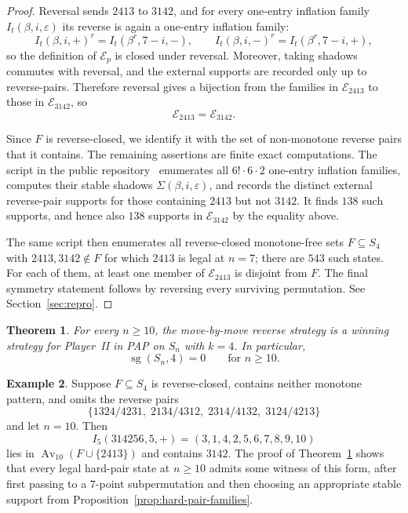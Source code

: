 \documentclass[11pt]{amsart}
\newcommand{\Sym}{S}
\newcommand{\Av}{\operatorname{Av}}
\newcommand{\sg}{\operatorname{sg}}
\theoremstyle{plain}
\newtheorem{theorem}{Theorem}[section]
\theoremstyle{definition}
\newtheorem{example}[theorem]{Example}
\theoremstyle{remark}
\begin{document}
\begin{proof}
  Reversal sends $2413$ to $3142$, and for every one-entry inflation family
  $I_t(\beta,i,\varepsilon)$ its reverse is again a one-entry inflation family:
  \[
    I_t(\beta,i,+)^r = I_t(\beta^r,7-i,-),
    \qquad
    I_t(\beta,i,-)^r = I_t(\beta^r,7-i,+),
  \]
  so the definition of $\mathcal{E}_p$ is closed under reversal.  Moreover,
  taking shadows commutes with reversal, and the external supports are recorded only up to
  reverse-pairs.  Therefore reversal gives a bijection from the families in
  $\mathcal{E}_{2413}$ to those in $\mathcal{E}_{3142}$, so
  \[
    \mathcal{E}_{2413}=\mathcal{E}_{3142}.
  \]

  Since $F$ is reverse-closed, we identify it with the set of non-monotone reverse pairs that it
  contains.  The remaining assertions are finite exact computations.  The script
   in the public repository~\cite{game-patterns-repo}
  enumerates all $6!\cdot 6 \cdot 2$ one-entry inflation families,
  computes their stable shadows $\Sigma(\beta,i,\varepsilon)$, and records the distinct external
  reverse-pair supports for those containing $2413$ but not $3142$.  It finds $138$ such supports,
  and hence also $138$ supports in $\mathcal{E}_{3142}$ by the equality above.

  The same script then enumerates all reverse-closed monotone-free sets $F \subseteq \Sym_4$ with
  $2413,3142 \notin F$ for which $2413$ is legal at $n=7$; there are $543$ such states.  For each of
  them, at least one member of $\mathcal{E}_{2413}$ is disjoint from $F$.  The final symmetry
  statement follows by reversing every surviving permutation.  See Section~\ref{sec:repro}.
\end{proof}

\begin{theorem}\label{thm:k4}
  For every $n \geq 10$, the move-by-move reverse strategy is a winning strategy for Player~II in PAP
  on $\Sym_n$ with $k=4$.  In particular,
  \[
    \sg(\Sym_n,4)=0 \qquad \text{for } n \geq 10.
  \]
\end{theorem}

\begin{example}
  Suppose $F \subseteq \Sym_4$ is reverse-closed, contains neither monotone pattern, and omits the
  reverse pairs
  \[
    \{1324/4231,\; 2134/4312,\; 2314/4132,\; 3124/4213\}
  \]
  and let $n=10$.  Then
  \[
    I_5(314256,5,+)=(3,1,4,2,5,6,7,8,9,10)
  \]
  lies in $\Av_{10}(F\cup\{2413\})$ and contains $3142$.  The proof of
  Theorem~\ref{thm:k4} shows that every legal hard-pair state at $n \geq 10$ admits some witness of
  this form, after first passing to a $7$-point subpermutation and then choosing an appropriate stable
  support from Proposition~\ref{prop:hard-pair-families}.
\end{example}
\end{document}
